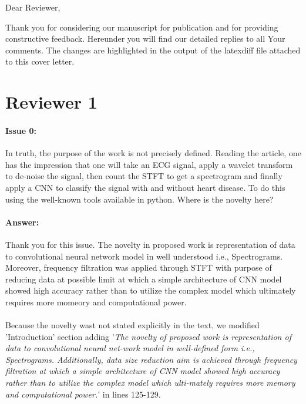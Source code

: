 \documentclass{article}
\begin{document}
Dear Reviewer,

\vspace{0.25in}

Thank you for considering our manuscript for publication and for providing constructive feedback.
Hereunder you will find our detailed replies to all Your comments.
The changes are highlighted in the output of the latexdiff file attached to this cover letter.


\section{Reviewer 1}

\paragraph{Issue 0:}
\begin{displayquote}
In truth, the purpose of the work is not precisely defined. Reading the article, one has the impression that one will take an ECG signal, apply a wavelet transform to de-noise the signal, then count the STFT to get a spectrogram and finally apply a CNN to classify the signal with and without heart disease. To do this using the well-known tools available in python. Where is the novelty here?
\end{displayquote}

\paragraph{Answer:}
Thank you for this issue. The novelty in proposed work is representation of data to convolutional neural network model in well understood i.e., Spectrograms. Moreover,  frequency filtration was applied through STFT with purpose of reducing data at possible limit at which a simple architecture of CNN model showed high accuracy rather than to utilize the complex model which ultimately requires more momeory and computational power.\\\\

Because the novelty wast not stated explicitly in the text, we modified 'Introduction' section adding '\textit{The novelty of proposed work is representation of data to convolutional neural net-work model in well-defined form i.e., Spectrograms. Additionally, data size reduction aim is achieved through frequency filtration at which a simple architecture of CNN model showed high accuracy rather than to utilize the complex model which ulti-mately requires more memory and computational power.}' in lines 125-129.
\end{document}
